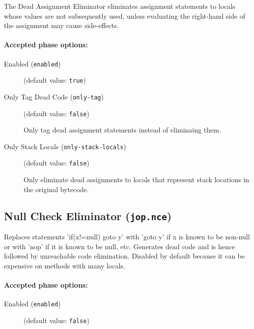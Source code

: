 \documentclass{article}
\begin{document}
The Dead Assignment Eliminator eliminates assignment statements
to locals whose values are not subsequently used, unless
evaluating the right-hand side of the assignment may cause
side-effects.


\paragraph{Accepted phase options:} 

\begin{description}

\item[Enabled ({\tt enabled})]
(default value: {\tt true})






\item[Only Tag Dead Code ({\tt only-tag})]
(default value: {\tt false})




Only tag dead assignment statements instead of eliminaing them.



\item[Only Stack Locals ({\tt only-stack-locals})]
(default value: {\tt false})




Only eliminate dead assignments to locals that represent stack
locations in the original bytecode.



\end{description}

\subsection{Null Check Eliminator ({\tt jop.nce})}

Replaces statements 'if(x!=null) goto y' with 'goto y' if x is
known to be non-null or with 'nop' if it is known to be null,
etc. Generates dead code and is hence followed by unreachable
code elimination. Disabled by default because it can be
expensive on methods with many locals.


\paragraph{Accepted phase options:} 

\begin{description}

\item[Enabled ({\tt enabled})]
(default value: {\tt false})






\end{description}
\end{document}
